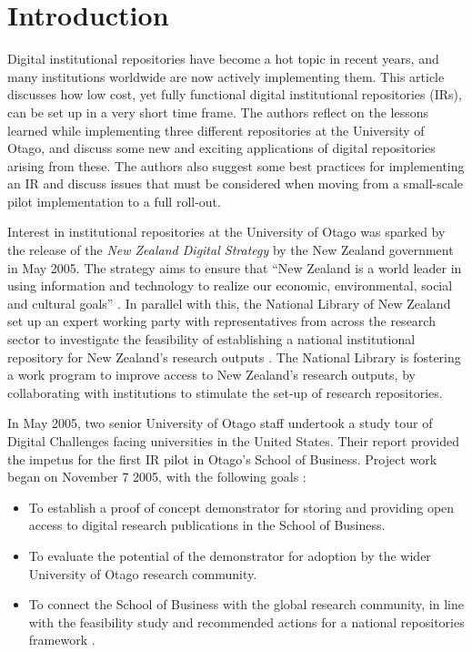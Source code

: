 \documentclass[12pt,pdftex,a4paper,titlepage]{article}
\begin{document}
\section{Introduction}

Digital institutional repositories have become a hot topic in recent years, and many institutions worldwide are now actively implementing them. This article discusses how low cost, yet fully functional digital institutional repositories (IRs), can be set up in a very short time frame. The authors reflect on the lessons learned while implementing three different repositories at the University of Otago, and discuss some new and exciting applications of digital repositories arising from these. The authors also suggest some best practices for implementing an IR and discuss issues that must be considered when moving from a small-scale pilot implementation to a full roll-out.

Interest in institutional repositories at the University of Otago was sparked by the release of the \emph{New Zealand Digital Strategy} by the New Zealand government in May 2005. The strategy aims to ensure that ``New Zealand is a world leader in using information and technology to realize our economic, environmental, social and cultural goals'' \cite{NZG-2005-digital_strategy}. In parallel with this, the National Library of New Zealand set up an expert working party with representatives from across the research sector to investigate the feasibility of establishing a national institutional repository for New Zealand's research outputs \cite{Rank-J-2005-feasibility}. The National Library is fostering a work program to improve access to New Zealand's research outputs, by collaborating with institutions to stimulate the set-up of research repositories.

In May 2005, two senior University of Otago staff undertook a study tour of Digital Challenges facing universities in the United States. Their report provided the impetus for the first IR pilot in Otago's School of Business. Project work began on November 7 2005, with the following goals \cite{Stan-N-2006-running}:
\begin{itemize}

	\item To establish a proof of concept demonstrator for storing and providing open access to digital research publications in the School of Business.

	\item To evaluate the potential of the demonstrator for adoption by the wider University of Otago research community.

	\item To connect the School of Business with the global research community, in line with the feasibility study and recommended actions for a national repositories framework \cite{Rank-J-2005-feasibility}.

\end{itemize}
\end{document}
